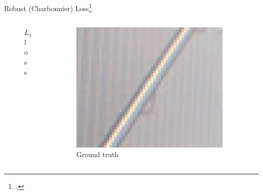 \documentclass{beamer}
\begin{document}
\begin{frame}{Robust (Charbonnier) Loss\footcite{LapSRN}}
\begin{columns}
\begin{column}{0.33\linewidth}
\begin{figure}[h]
      \caption*{$L_1$ loss}
    \end{figure}
  \end{column}  \begin{column}{0.33\linewidth}
    \begin{figure}[h]
      \centering
        \includegraphics[width=0.9\textwidth]{loss_functions_lap_gt}
      \caption*{Ground truth}
    \end{figure}
  \end{column}
\end{columns}
\end{frame}
\end{document}
